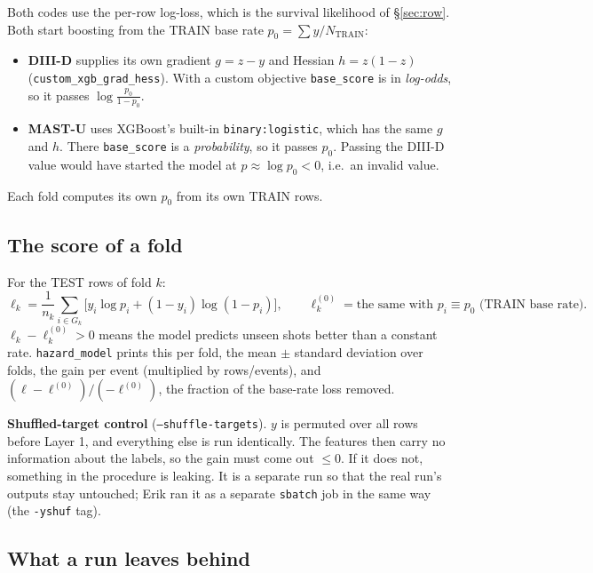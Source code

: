 \documentclass[11pt]{article}
\begin{document}
Both codes use the per-row log-loss, which is the survival likelihood of
\S\ref{sec:row}. Both start boosting from the TRAIN base rate
$p_0=\sum y/N_{\text{TRAIN}}$:
\begin{itemize}
\item \textbf{DIII-D} supplies its own gradient $g=z-y$ and Hessian
  $h=z(1-z)$ (\texttt{custom\_xgb\_grad\_hess}). With a custom objective
  \texttt{base\_score} is in \emph{log-odds}, so it passes
  $\log\frac{p_0}{1-p_0}$.
\item \textbf{MAST-U} uses XGBoost's built-in \texttt{binary:logistic}, which
  has the same $g$ and $h$. There \texttt{base\_score} is a
  \emph{probability}, so it passes $p_0$. Passing the DIII-D value would have
  started the model at $p\approx\log p_0<0$, i.e.\ an invalid value.
\end{itemize}
Each fold computes its own $p_0$ from its own TRAIN rows.

\subsection{The score of a fold}

For the TEST rows of fold $k$:
\[
\ell_k=\frac{1}{n_k}\sum_{i\in G_k}\bigl[y_i\log p_i+(1-y_i)\log(1-p_i)\bigr],
\qquad
\ell^{(0)}_k=\text{the same with } p_i\equiv p_0 \text{ (TRAIN base rate)} .
\]
$\ell_k-\ell^{(0)}_k>0$ means the model predicts unseen shots better than a
constant rate. \texttt{hazard\_model} prints this per fold, the mean $\pm$
standard deviation over folds, the gain per event (multiplied by rows/events),
and $(\ell-\ell^{(0)})/(-\ell^{(0)})$, the fraction of the base-rate loss
removed.

\textbf{Shuffled-target control} (\texttt{--shuffle-targets}). $y$ is permuted
over all rows before Layer 1, and everything else is run identically. The
features then carry no information about the labels, so the gain must come out
$\le0$. If it does not, something in the procedure is leaking. It is a separate
run so that the real run's outputs stay untouched; Erik ran it as a separate
\texttt{sbatch} job in the same way (the \texttt{-yshuf} tag).

\subsection{What a run leaves behind}
\end{document}
